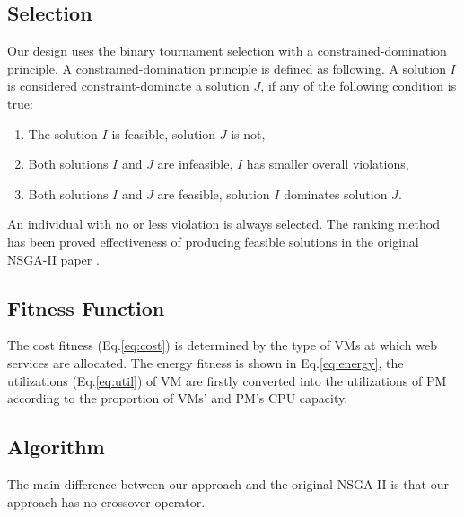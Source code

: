 \subsection{Selection}
Our design uses the binary tournament selection with a constrained-domination principle. A constrained-domination principle is defined as following. A solution $I$ is considered constraint-dominate a solution $J$, if any of the following condition is true:
\begin{enumerate}
  \item The solution $I$ is feasible, solution $J$ is not,
  \item Both solutions  $I$ and $J$ are infeasible, $I$ has smaller overall
violations,
  \item Both solutions $I$ and $J$ are feasible, solution $I$ dominates solution $J$.
\end{enumerate}

An individual with no or less violation is always selected. The ranking method has been proved effectiveness of producing feasible solutions in the original NSGA-II paper \cite{nsgaii}.

\subsection{Fitness Function}
The cost fitness (Eq.\ref{eq:cost}) is determined by the type of VMs at which web services are allocated. 
The energy fitness is shown in Eq.\ref{eq:energy}, the utilizations (Eq.\ref{eq:util}) of VM are firstly converted into the utilizations of PM according to the proportion of VMs’ and PM’s CPU capacity.

\subsection{Algorithm}
\label{sec:pseudocode}
The main difference between our approach and the original NSGA-II is that our approach has no crossover operator.

